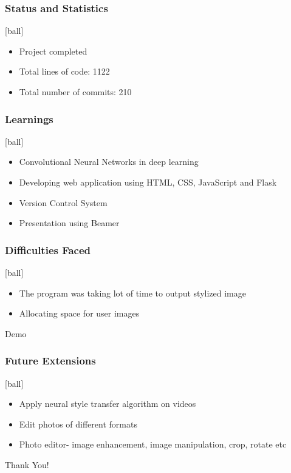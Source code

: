 \documentclass[14pt]{beamer}
\begin{document}
\begin{frame}
		\frametitle{Status and Statistics}
		\begin{itemize}
		\item Project completed
        \item Total lines of code: 1122
		\item Total number of commits: 210
		\end{itemize}
\end{frame}

\begin{frame}
		\frametitle{Learnings}
        \begin{itemize}
		\item Convolutional Neural Networks in deep learning
        \item Developing web application using HTML, CSS, JavaScript and Flask
		\item Version Control System
		\item Presentation using Beamer
		\end{itemize}
\end{frame}

\begin{frame}
		\frametitle{Difficulties Faced}
        \begin{itemize}

				\item The program was taking lot of time to output stylized image
                \item Allocating space for user images
		\end{itemize}
\end{frame}

\begin{frame}
    \begin{center}
        \Huge Demo
    \end{center}
\end{frame}
   
\begin{frame}
    \frametitle{Future Extensions}
    [ball]
    \begin{itemize}
    \item Apply neural style transfer algorithm on videos
    \item Edit photos of different formats
    \item Photo editor- image enhancement, image manipulation, crop, rotate etc
    \end{itemize}
\end{frame}

\begin{frame}
    \begin{center}  
       \Huge Thank You!
    \end{center}
\end{frame}
\end{document}
